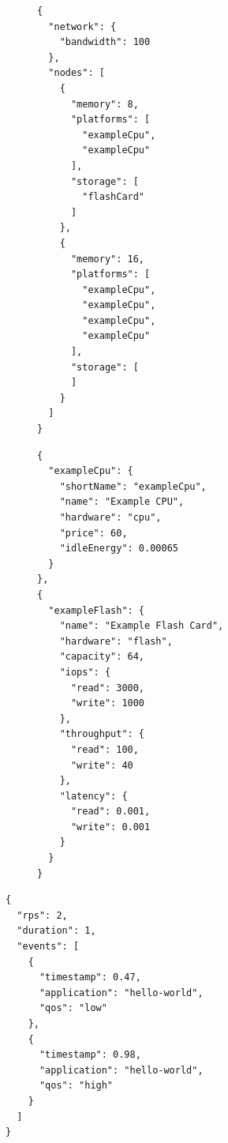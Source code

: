 \begin{figure}[!ht]
    \label{code:herosim-json-infrastructure}
    \begin{minipage}{0.49\textwidth}
        \centering
        \begin{verbatim}
{
  "network": {
    "bandwidth": 100
  },
  "nodes": [
    {
      "memory": 8,
      "platforms": [
        "exampleCpu",
        "exampleCpu"
      ],
      "storage": [
        "flashCard"
      ]
    },
    {
      "memory": 16,
      "platforms": [
        "exampleCpu",
        "exampleCpu",
        "exampleCpu",
        "exampleCpu"
      ],
      "storage": [
      ]
    }
  ]
}
        \end{verbatim}
    \end{minipage}
    \begin{minipage}{0.49\textwidth}
        \centering
        \begin{verbatim}
{
  "exampleCpu": {
    "shortName": "exampleCpu",
    "name": "Example CPU",
    "hardware": "cpu",
    "price": 60,
    "idleEnergy": 0.00065
  }
},
{
  "exampleFlash": {
    "name": "Example Flash Card",
    "hardware": "flash",
    "capacity": 64,
    "iops": {
      "read": 3000,
      "write": 1000
    },
    "throughput": {
      "read": 100,
      "write": 40
    },
    "latency": {
      "read": 0.001,
      "write": 0.001
    }
  }
}
        \end{verbatim}
    \end{minipage}
\end{figure}

\begin{listing}
    \caption{Description \gls{JSON} d'une trace d'exécution comportant deux appels à l'application \texttt{hello-world}.}
    \label{code:herosim-json-trace}
    \begin{verbatim}
{
  "rps": 2,
  "duration": 1,
  "events": [
    {
      "timestamp": 0.47,
      "application": "hello-world",
      "qos": "low"
    },
    {
      "timestamp": 0.98,
      "application": "hello-world",
      "qos": "high"
    }
  ]
}
    \end{verbatim}
\end{listing}

